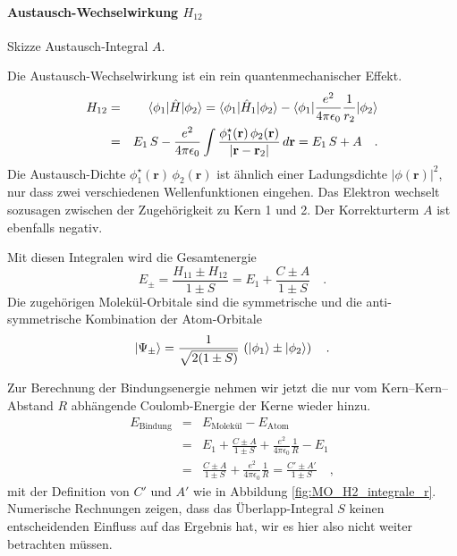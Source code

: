 \paragraph{Austausch-Wechselwirkung $H_{12}$} 
\begin{marginfigure}
\caption{Skizze Austausch-Integral $A$.}
\end{marginfigure}
%
Die Austausch-Wechselwirkung ist ein rein quantenmechanischer Effekt.
\begin{eqnarray}
H_{12} &= &  \braket{\phi_1 | \hat{H} | \phi_2} = \braket{\phi_1 | \hat{H}_1 | \phi_2}  - \braket{\phi_1 |  \frac{e^2}{4 \pi \epsilon_0} \frac{1}{r_{2}} | \phi_2}  \\
 & = & E_1 \, S - \frac{e^2}{4 \pi \epsilon_0} \int \frac{ \phi_1^\star(\mathbf{r}) \, \phi_2(\mathbf{r})  }{|\mathbf{r} - \mathbf{r}_2  |} \, d\mathbf{r} = E_1 \, S + A \quad .
\end{eqnarray}
Die Austausch-Dichte $\phi_1^\star(\mathbf{r}) \, \phi_2(\mathbf{r})$ ist ähnlich einer Ladungsdichte $|\phi(\mathbf{r})|^2$, nur dass zwei verschiedenen Wellenfunktionen eingehen. Das Elektron wechselt sozusagen zwischen der Zugehörigkeit zu Kern 1 und 2. Der Korrekturterm $A$ ist ebenfalls negativ.



Mit diesen Integralen wird die Gesamtenergie
\begin{equation}
E_\pm = \frac{H_{11} \pm H_{12}}{1 \pm S} = E_1 + \frac{C \pm A}{1 \pm S} \quad .
\end{equation}
Die zugehörigen Molekül-Orbitale sind die symmetrische und die anti-symmetrische Kombination der Atom-Orbitale
\begin{equation}
\ket{\Psi_\pm }= \frac{1}{\sqrt{2 (1 \pm  S)}} \, \left( \ket{\phi_1} \pm \ket{\phi_2} \right) \quad .
\end{equation}

Zur Berechnung der Bindungsenergie nehmen wir jetzt die nur vom Kern--Kern--Abstand $R$ abhängende Coulomb-Energie der Kerne wieder hinzu. 
%
\begin{eqnarray}
 E_\text{Bindung} &=&  E_\text{Molekül} -  E_\text{Atom} \\
  &=&   E_1 + \frac{C \pm A}{1 \pm S} + \frac{e^2}{4 \pi \epsilon_0} \frac{1}{R} - E_1 \\
   &=&\frac{C \pm A}{1 \pm S} + \frac{e^2}{4 \pi \epsilon_0} \frac{1}{R}  = \frac{C' \pm A'}{1 \pm S}  \quad , \label{eq:MO_E_bindung_h2p}
\end{eqnarray}
mit der Definition  von $C'$ und $A'$ wie in Abbildung \ref{fig:MO_H2_integrale_r}.
Numerische Rechnungen zeigen, dass das Überlapp-Integral $S$ keinen entscheidenden Einfluss auf das Ergebnis hat, wir es hier also nicht weiter betrachten müssen.

